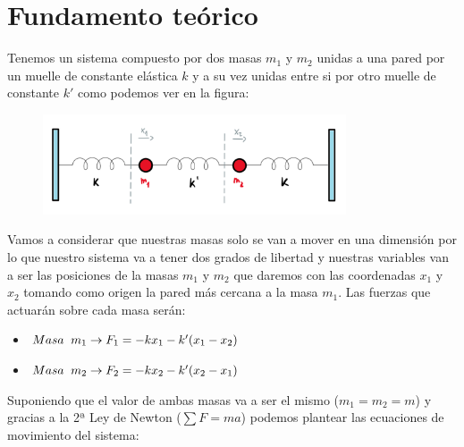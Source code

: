 \documentclass{article}
\begin{document}
\section{Fundamento teórico}
Tenemos un sistema compuesto por dos masas $m_1$ y $m_2$ unidas a una pared por un muelle de constante elástica $k$ y a su vez unidas entre si por otro muelle de constante $k'$ como podemos ver en la figura:
\begin{figure}[H]
    \centering
    \includegraphics[width=0.8\textwidth]{muelles}
\label{fig:0}
\end{figure}
\noindent Vamos a considerar que nuestras masas solo se van a mover en una dimensión por lo que nuestro sistema va a tener dos grados de libertad y nuestras variables van a ser las posiciones de la masas $m_1$ y $m_2$ que daremos con las coordenadas $x_1$ y $x_2$ tomando como origen la pared más cercana a la masa $m_1$.\newline\linebreak
Las fuerzas que actuarán sobre cada masa serán:\vspace{0.3cm}
\begin{itemize}
\item $Masa\hspace{0.2cm} m_1 \rightarrow F_1 = -kx_1 -k'(x_1-x_2)$
\item $Masa\hspace{0.2cm} m_2 \rightarrow F_2 = -kx_2 -k'(x_2-x_1)$
\end{itemize}\vspace{0.3cm}
Suponiendo que el valor de ambas masas va a ser el mismo ($m_1 = m_2 = m$) y gracias a la 2ª Ley de Newton ($\sum F = ma$) podemos plantear las ecuaciones de movimiento del sistema:
\end{document}
